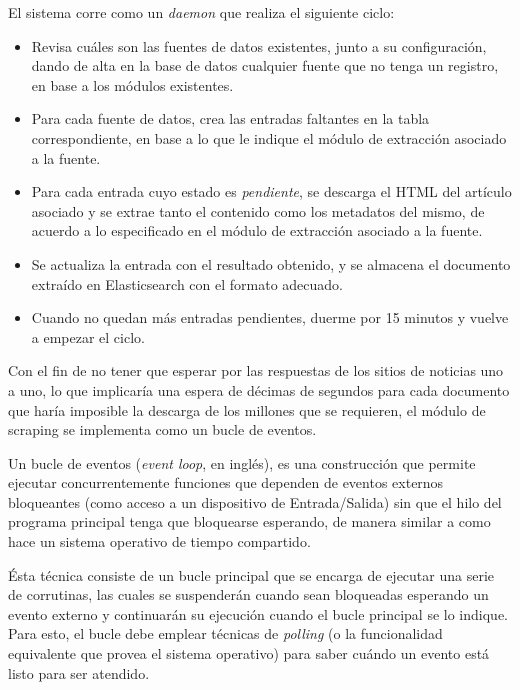 El sistema corre como un \textit{daemon} que realiza el siguiente ciclo:

\begin{itemize}

\item Revisa cuáles son las fuentes de datos existentes, junto a su configuración, dando de alta en
la base de datos cualquier fuente que no tenga un registro, en base a los módulos existentes.

\item Para cada fuente de datos, crea las entradas faltantes en la tabla correspondiente, en base a
lo que le indique el módulo de extracción asociado a la fuente.

\item Para cada entrada cuyo estado es \textit{pendiente}, se descarga el HTML del artículo asociado
y se extrae tanto el contenido como los metadatos del mismo, de acuerdo a lo especificado en el
módulo de extracción asociado a la fuente.

\item Se actualiza la entrada con el resultado obtenido, y se almacena el documento extraído en
Elasticsearch con el formato adecuado.

\item Cuando no quedan más entradas pendientes, duerme por 15 minutos y vuelve a empezar el ciclo.

\end{itemize}

Con el fin de no tener que esperar por las respuestas de los sitios de noticias uno a uno, lo que
implicaría una espera de décimas de segundos para cada documento que haría imposible la descarga de
los millones que se requieren, el módulo de scraping se implementa como un bucle de eventos.

Un bucle de eventos (\textit{event loop}, en inglés), es una construcción que permite ejecutar
concurrentemente funciones que dependen de eventos externos bloqueantes (como acceso a un
dispositivo de Entrada/Salida) sin que el hilo del programa principal tenga que bloquearse
esperando, de manera similar a como hace un sistema operativo de tiempo compartido.

Ésta técnica consiste de un bucle principal que se encarga de ejecutar una serie de corrutinas, las
cuales se suspenderán cuando sean bloqueadas esperando un evento externo y continuarán su ejecución
cuando el bucle principal se lo indique. Para esto, el bucle debe emplear técnicas de
\textit{polling} (o la funcionalidad equivalente que provea el sistema operativo) para saber cuándo
un evento está listo para ser atendido.

